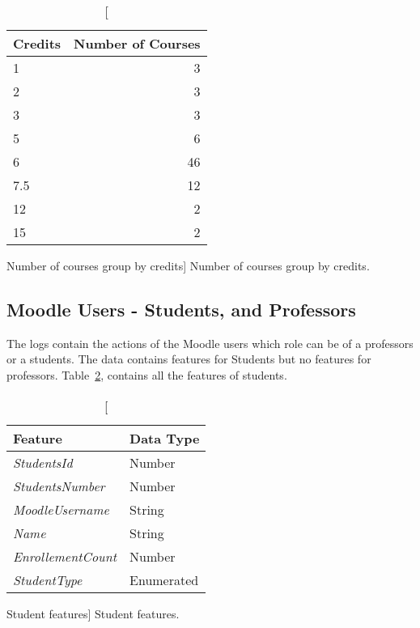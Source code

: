 \begin{table}[h!]
    \centering

    \begin{tabular}{| l | r |}
        \hline
        Credits & Number of Courses \\ \hline
        1       & 3                 \\ \hline
        2       & 3                 \\ \hline
        3       & 3                 \\ \hline
        5       & 6                 \\ \hline
        6       & 46                \\ \hline
        7.5     & 12                \\ \hline
        12      & 2                 \\ \hline
        15      & 2                 \\ \hline
    \end{tabular}

    \caption
        [Number of courses group by credits]
        {Number of courses group by credits.}

    \label{tab:courses_credits}
\end{table}

\subsection{Moodle Users - Students, and Professors}
\label{ref:moodle_users}

The logs contain the actions of the Moodle users which role can be of a
professors or a students. The data contains features for Students but no
features for professors. Table~\ref{tab:students_features}, contains all the
features of students.

\begin{table}[h!]
    \centering

    \begin{tabular}{l l}
        Feature                   & Data Type  \\ \hline
        \textit{StudentsId}       & Number     \\
        \textit{StudentsNumber}   & Number     \\
        \textit{MoodleUsername}   & String     \\
        \textit{Name}             & String     \\
        \textit{EnrollementCount} & Number     \\
        \textit{StudentType}      & Enumerated \\
    \end{tabular}

    \caption
        [Student features]
        {Student features.}

    \label{tab:students_features}
\end{table}

